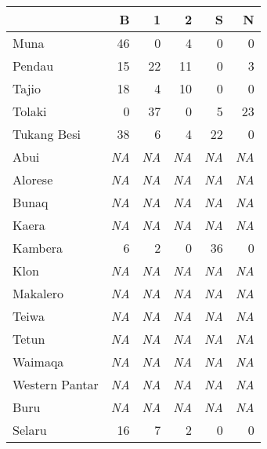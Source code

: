 \begin{table}


\begin{tabular}{lrrrrr}
  \hline\hline
 & B & 1 & 2 & S & N \tabularnewline 
  \hline
  Muna &  46 &   0 &   4 &   0 &   0 \tabularnewline 
  Pendau &  15 &  22 &  11 &   0 &   3 \tabularnewline 
  Tajio &  18 &   4 &  10 &   0 &   0 \tabularnewline 
  Tolaki &   0 &  37 &   0 &   5 &  23 \tabularnewline 
  Tukang Besi &  38 &   6 &   4 &  22 &   0 \tabularnewline \hline
  {\color{gray}Abui} & {\color{gray}\textit{NA}} & {\color{gray}\textit{NA}} & {\color{gray}\textit{NA}} &   {\color{gray}\textit{NA}} & {\color{gray}\textit{NA}} \tabularnewline 
  {\color{gray}Alorese} & {\color{gray}\textit{NA}} & {\color{gray}\textit{NA}} & {\color{gray}\textit{NA}} &   {\color{gray}\textit{NA}} & {\color{gray}\textit{NA}} \tabularnewline 
  {\color{gray}Bunaq} & {\color{gray}\textit{NA}} & {\color{gray}\textit{NA}} & {\color{gray}\textit{NA}} &   {\color{gray}\textit{NA}} & {\color{gray}\textit{NA}} \tabularnewline 
  {\color{gray}Kaera} & {\color{gray}\textit{NA}} & {\color{gray}\textit{NA}} & {\color{gray}\textit{NA}} &   {\color{gray}\textit{NA}} & {\color{gray}\textit{NA}} \tabularnewline
  Kambera &  6 &   2 &   0 &  36 &   0 \tabularnewline
  {\color{gray}Klon} & {\color{gray}\textit{NA}} & {\color{gray}\textit{NA}} & {\color{gray}\textit{NA}} &   {\color{gray}\textit{NA}} & {\color{gray}\textit{NA}} \tabularnewline 
  {\color{gray}Makalero} & {\color{gray}\textit{NA}} & {\color{gray}\textit{NA}} & {\color{gray}\textit{NA}} &  {\color{gray}\textit{NA}} & {\color{gray}\textit{NA}} \tabularnewline 
  {\color{gray}Teiwa} & {\color{gray}\textit{NA}} & {\color{gray}\textit{NA}} & {\color{gray}\textit{NA}} &   {\color{gray}\textit{NA}} & {\color{gray}\textit{NA}} \tabularnewline 
  {\color{gray}Tetun} & {\color{gray}\textit{NA}} & {\color{gray}\textit{NA}} & {\color{gray}\textit{NA}} &   {\color{gray}\textit{NA}} & {\color{gray}\textit{NA}} \tabularnewline 
  {\color{gray}Waimaqa} & {\color{gray}\textit{NA}} & {\color{gray}\textit{NA}} & {\color{gray}\textit{NA}} &   {\color{gray}\textit{NA}} & {\color{gray}\textit{NA}} \tabularnewline 
  {\color{gray}Western Pantar} & {\color{gray}\textit{NA}} & {\color{gray}\textit{NA}} & {\color{gray}\textit{NA}} &  {\color{gray}\textit{NA}} & {\color{gray}\textit{NA}} \tabularnewline \hline 
  {\color{gray}Buru} & {\color{gray}\textit{NA}} & {\color{gray}\textit{NA}} & {\color{gray}\textit{NA}} & {\color{gray}\textit{NA}} & {\color{gray}\textit{NA}} \tabularnewline
  Selaru &  16 &   7 &   2 &   0 &   0 \tabularnewline 

\end{tabular}
\end{table}
